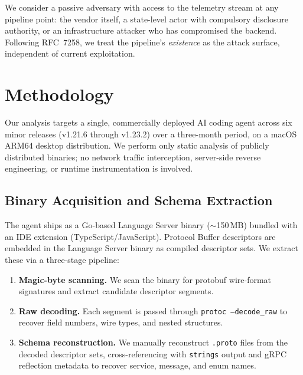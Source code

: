 \documentclass[sigconf,anonymous]{acmart}
\begin{document}
We consider a passive adversary with access to the telemetry stream
at any pipeline point: the vendor itself, a state-level actor with
compulsory disclosure authority, or an infrastructure attacker who has
compromised the backend.  Following RFC~7258, we treat the pipeline's
\emph{existence} as the attack surface, independent of current
exploitation.


\section{Methodology}\label{sec:methodology}

Our analysis targets a single, commercially deployed AI coding agent
across six minor releases (v1.21.6 through v1.23.2) over a three-month
period, on a macOS ARM64 desktop distribution.  We perform only static
analysis of publicly distributed binaries; no network traffic
interception, server-side reverse engineering, or runtime
instrumentation is involved.

\subsection{Binary Acquisition and Schema Extraction}

The agent ships as a Go-based Language Server binary ($\sim$150\,MB)
bundled with an IDE extension (TypeScript/JavaScript).  Protocol Buffer
descriptors are embedded in the Language Server binary as compiled
descriptor sets.  We extract these via a three-stage pipeline:

\begin{enumerate}[nosep]
  \item \textbf{Magic-byte scanning.}  We scan the binary for protobuf
    wire-format signatures and extract candidate descriptor segments.
  \item \textbf{Raw decoding.}  Each segment is passed through
    \texttt{protoc --decode\_raw} to recover field numbers, wire types,
    and nested structures.
  \item \textbf{Schema reconstruction.}  We manually reconstruct
    \texttt{.proto} files from the decoded descriptor sets,
    cross-referencing with \texttt{strings} output and gRPC reflection
    metadata to recover service, message, and enum names.
\end{enumerate}
\end{document}
